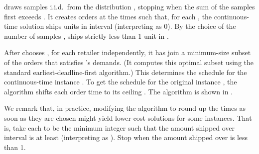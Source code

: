  draws samples 
i.i.d.~from the distribution , 
stopping when the sum of the samples first exceeds .
It creates orders at the times 
such that, for each ,
the continuous-time solution  
ships  units in interval  (interpreting  as 0).
By the choice of the number of samples ,
 ships strictly less than 1 unit in .

After  chooses , 
for each retailer  independently,
it has  join a minimum-size subset of the orders that satisfies 's demands.
(It computes this optimal subset using the standard earliest-deadline-first algorithm.)
This determines the schedule  for the continuous-time instance .
To get the schedule  for the original instance ,
the algorithm shifts each order time  to its ceiling .
The algorithm is shown in .

We remark that, in practice, modifying the algorithm to round up 
the times as soon as they are chosen might yield lower-cost solutions for some instances.  
That is, take each  to be the minimum integer such that the amount shipped over 
interval  is at least  (interpreting  as ).  
Stop when the amount shipped over  is less than 1.



\newcommand{\StateLong}[1]
{\State\parbox[t]{\dimexpr\linewidth-\algorithmicindent}{#1 \strut}}

